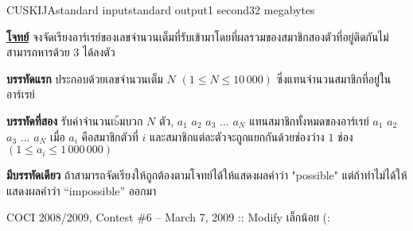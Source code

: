 \documentclass[11pt,a4paper]{article}
\begin{document}
\begin{problem}{CUSKIJA}{standard input}{standard output}{1 second}{32 megabytes}

\bigskip
\underline{\textbf{โจทย์}}  จงจัดเรียงอาร์เรย์ของเลขจํานวนเต็มที่รับเข้ามาโดยที่ผลรวมของสมาชิกสองตัวที่อยู่ติดกันไม่สามารถหารด้วย $3$ ได้ลงตัว

\InputFile

\textbf{บรรทัดแรก} ประกอบด้วยเลขจํานวนเต็ม $N$ $(1 \leq N \leq 10\,000)$ ซึ่งแทนจํานวนสมาชิกที่อยู่ในอาร์เรย์

\textbf{บรรทัดที่สอง} รับค่าจำนวนเ๖้มบวก $N$ ตัว, $a_1$ $a_2$ $a_3$ $...$ $a_N$ แทนสมาชิกทั้งหมดของอาร์เรย์ $a_1$ $a_2$ $a_3$ $...$ $a_N$ เมื่อ $a_i$ คือสมาชิกตัวที่ $i$ และสมาชิกแต่ละตัวจะถูกแยกกันด้วยช่องว่าง $1$ ช่อง $(1 \leq a_i \leq 1\,000\,000)$

\OutputFile

\textbf{มีบรรทัดเดียว} ถ้าสามารถจัดเรียงให้ถูกต้องตามโจทย์ได้ให้แสดงผลคําว่า "possible" แต่ถ้าทําไม่ได้ให้แสดงผลคําว่า “impossible” ออกมา

\Examples

\begin{example}
%
%
%
\end{example}


\Source

COCI 2008/2009, Contest \#6 – March 7, 2009 :: Modify เล็กน้อย (:

\end{problem}
\end{document}
